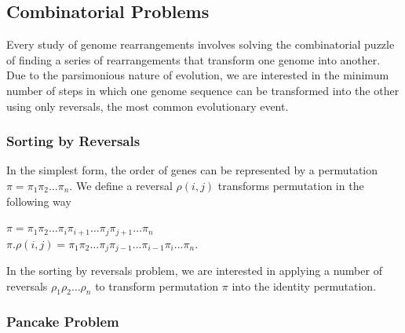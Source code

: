


\subsection{Combinatorial Problems}

Every study of genome rearrangements involves solving the combinatorial puzzle of finding a series of rearrangements that transform one genome into another. Due to the parsimonious nature of evolution, we are interested in the minimum number of steps in which one genome sequence can be transformed into the other using only reversals, the most common evolutionary event. 
\subsubsection{Sorting by Reversals}
In the simplest form, the order of genes can be represented by a permutation  $ \pi = \pi_{1} \pi_{2} \ldots \pi_{n} $. We define a reversal $ \rho (i, j) $ transforms permutation in the following way 
\begin{center}
$ \pi = \pi_{1} \pi_{2} \ldots \pi_{i} \pi_{i+1} \ldots \pi_{j} \pi_{j+1}  \ldots \pi_{n} $ \\ 
$ \pi . \rho (i, j) = \pi_{1} \pi_{2} \ldots \pi_{j} \pi_{j-1} \ldots \pi_{i-1} \pi_{i} \ldots \pi_{n} $.
\end{center}

In the sorting by reversals problem, we are interested in applying a number of reversals $ \rho_1 \rho_2 \ldots \rho_n $ to transform permutation $ \pi $ into the identity permutation.

\subsubsection{Pancake Problem}

